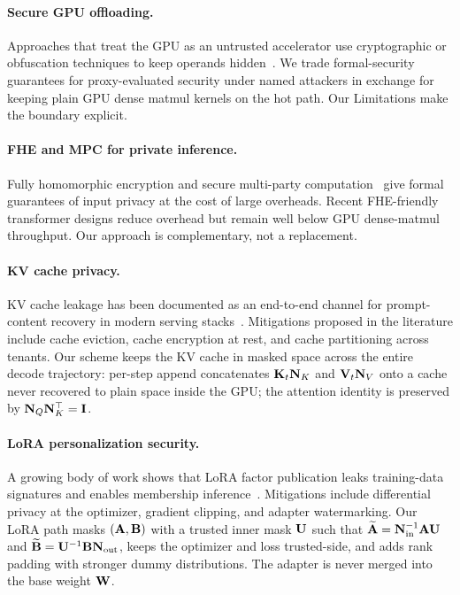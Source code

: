 \paragraph{Secure GPU offloading.}
Approaches that treat the GPU as an untrusted accelerator use cryptographic or obfuscation techniques to keep operands hidden~\cite{tramer2019slalom, volos2018graviton}. We trade formal-security guarantees for proxy-evaluated security under named attackers in exchange for keeping plain GPU dense matmul kernels on the hot path. Our Limitations make the boundary explicit.

\paragraph{FHE and MPC for private inference.}
Fully homomorphic encryption and secure multi-party computation~\cite{gilad2016cryptonets, juvekar2018gazelle, mishra2020delphi, mohassel2017secureml} give formal guarantees of input privacy at the cost of large overheads. Recent FHE-friendly transformer designs reduce overhead but remain well below GPU dense-matmul throughput. Our approach is complementary, not a replacement.

\paragraph{KV cache privacy.}
KV cache leakage has been documented as an end-to-end channel for prompt-content recovery in modern serving stacks~\cite{kwon2023vllm}. Mitigations proposed in the literature include cache eviction, cache encryption at rest, and cache partitioning across tenants. Our scheme keeps the KV cache in masked space across the entire decode trajectory: per-step append concatenates $\mathbf{K}_t\mathbf{N}_{K}$ and $\mathbf{V}_t\mathbf{N}_{V}$ onto a cache never recovered to plain space inside the GPU; the attention identity is preserved by $\mathbf{N}_{Q}\mathbf{N}_{K}^{\top} = \mathbf{I}$.

\paragraph{LoRA personalization security.}
A growing body of work shows that LoRA factor publication leaks training-data signatures and enables membership inference~\cite{shokri2017membership, hu2022lora, dettmers2023qlora}. Mitigations include differential privacy at the optimizer, gradient clipping, and adapter watermarking. Our LoRA path masks $(\mathbf{A}, \mathbf{B})$ with a trusted inner mask $\mathbf{U}$ such that $\widetilde{\mathbf{A}} = \mathbf{N}_{\mathrm{in}}^{-1}\mathbf{A}\mathbf{U}$ and $\widetilde{\mathbf{B}} = \mathbf{U}^{-1}\mathbf{B}\mathbf{N}_{\mathrm{out}}$, keeps the optimizer and loss trusted-side, and adds rank padding with stronger dummy distributions. The adapter is never merged into the base weight $\mathbf{W}$.

